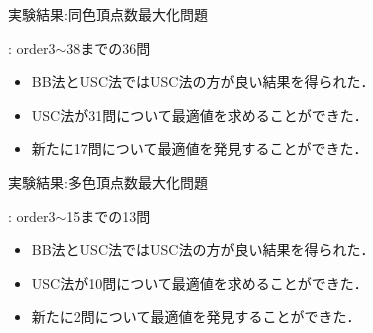 \documentclass[dvipdfmx,11pt]{beamer}
\begin{document}

\begin{frame}{実験結果:同色頂点数最大化問題}

 \begin{block}{}
  : order3$\sim$38までの36問
 \end{block}
 
 \begin{center}
  
 \end{center}

 \begin{itemize}
  \item BB法とUSC法ではUSC法の方が良い結果を得られた．
  \item USC法が31問について最適値を求めることができた．
  \item 新たに17問について最適値を発見することができた．
 \end{itemize}

\end{frame}


\begin{frame}{実験結果:多色頂点数最大化問題}

 \begin{block}{}
  : order3$\sim$15までの13問
 \end{block}
 
 \begin{center}
  
 \end{center}

 \begin{itemize}
  \item BB法とUSC法ではUSC法の方が良い結果を得られた．
  \item USC法が10問について最適値を求めることができた．
  \item 新たに2問について最適値を発見することができた．
 \end{itemize}

\end{frame}

\end{document}
